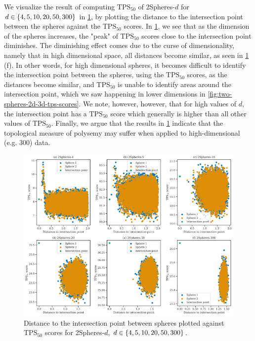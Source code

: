 We visualize the result of computing $\text{TPS}_{50}$ of 2Spheres-$d$ for $d \in \left\{4, 5, 10, 20, 50, 300\right\}$ in \cref{fig:two-spheres-distance-to-int-point-vs-tps-scores}, by plotting the distance to the intersection point between the spheres against the $\text{TPS}_{50}$ scores. In \cref{fig:two-spheres-distance-to-int-point-vs-tps-scores}, we see that as the dimension of the spheres increases, the "peak" of $\text{TPS}_{50}$ scores close to the intersection point diminishes. The diminishing effect comes due to the curse of dimensionality, namely that in high dimensional space, all distances become similar, as seen in \cref{fig:two-spheres-distance-to-int-point-vs-tps-scores} (f). In other words, for high dimensional spheres, it becomes difficult to identify the intersection point between the spheres, using the $\text{TPS}_{50}$ scores, as the distances become similar, and $\text{TPS}_{50}$ is unable to identify areas around the intersection point, which we saw happening in lower dimensions in \cref{fig:two-spheres-2d-3d-tps-scores}. We note, however, however, that for high values of $d$, the intersection point has a $\text{TPS}_{50}$ score which generally is higher than all other values of $\text{TPS}_{50}$. Finally, we argue that the results in \cref{fig:two-spheres-distance-to-int-point-vs-tps-scores} indicate that the topological measure of polysemy may suffer when applied to high-dimensional (e.g. 300) data.
\begin{figure}[H]
    \centering
    \includegraphics[width=\textwidth]{thesis/figures/two-spheres-distance-to-int-point-vs-tps-scores.pdf}
    \caption{Distance to the intersection point between spheres plotted against $\text{TPS}_{50}$ scores for 2Spheres-$d$, $d \in \left\{4, 5, 10, 20, 50, 300\right\}$.}
    \label{fig:two-spheres-distance-to-int-point-vs-tps-scores}
\end{figure}

